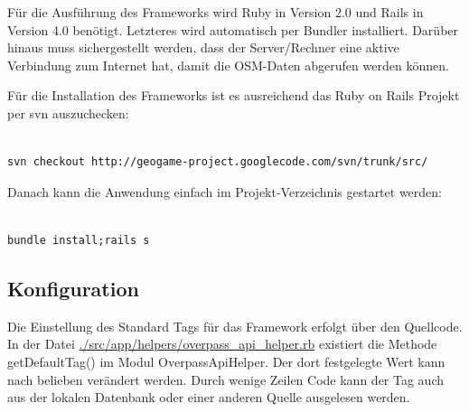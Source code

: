 Für die Ausführung des Frameworks wird Ruby in Version 2.0 und Rails in Version 4.0 benötigt. Letzteres wird automatisch per Bundler installiert.
Darüber hinaus muss sichergestellt werden, dass der Server/Rechner eine aktive Verbindung zum Internet hat, damit die OSM-Daten abgerufen werden können.

Für die Installation des Frameworks ist es ausreichend das Ruby on Rails Projekt per svn auszuchecken:\\\\

\lstset{
   language=Bash
}

\begin{lstlisting}[caption=CLI-Befehl für Code Checkout, label=code:ch8:bash01]
svn checkout http://geogame-project.googlecode.com/svn/trunk/src/
\end{lstlisting}

Danach kann die Anwendung einfach im Projekt-Verzeichnis gestartet werden:\\\\

\begin{lstlisting}[caption=CLI-Befehl für Start des Frameworks, label=code:ch8:bash02]
bundle install;rails s
\end{lstlisting}

\subsection*{Konfiguration}

Die Einstellung des Standard Tags für das Framework erfolgt über den Quellcode.
In der Datei \url{./src/app/helpers/overpass_api_helper.rb} existiert die Methode getDefaultTag() im Modul OverpassApiHelper.
Der dort festgelegte Wert kann nach belieben verändert werden. Durch wenige Zeilen Code kann der Tag auch aus der lokalen Datenbank oder einer anderen Quelle ausgelesen werden.